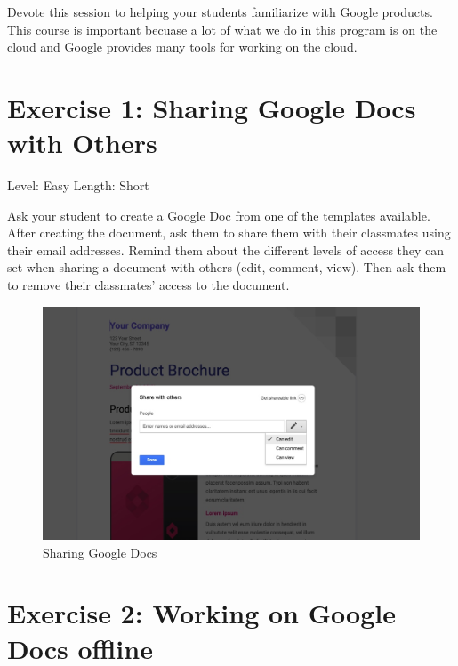 \documentclass[]{book}
\begin{document}
Devote this session to helping your students familiarize with Google products. This course is important becuase a lot of what we do in this program is on the cloud and Google provides many tools for working on the cloud.

\hypertarget{exercise-1-sharing-google-docs-with-others}{%
\section*{Exercise 1: Sharing Google Docs with Others}\label{exercise-1-sharing-google-docs-with-others}}

Level: Easy
Length: Short

Ask your student to create a Google Doc from one of the templates available. After creating the document, ask them to share them with their classmates using their email addresses. Remind them about the different levels of access they can set when sharing a document with others (edit, comment, view). Then ask them to remove their classmates' access to the document.

\begin{figure}
\centering
\includegraphics{./images/gdoc_share.jpg}
\caption{Sharing Google Docs}
\end{figure}

\hypertarget{exercise-2-working-on-google-docs-offline}{%
\section*{Exercise 2: Working on Google Docs offline}\label{exercise-2-working-on-google-docs-offline}}
\end{document}
